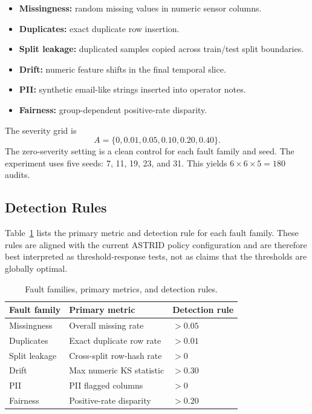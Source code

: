 \documentclass[runningheads]{llncs}
\begin{document}
\begin{itemize}
    \item \textbf{Missingness:} random missing values in numeric sensor columns.
    \item \textbf{Duplicates:} exact duplicate row insertion.
    \item \textbf{Split leakage:} duplicated samples copied across train/test
    split boundaries.
    \item \textbf{Drift:} numeric feature shifts in the final temporal slice.
    \item \textbf{PII:} synthetic email-like strings inserted into operator notes.
    \item \textbf{Fairness:} group-dependent positive-rate disparity.
\end{itemize}

The severity grid is
\[
A=\{0, 0.01, 0.05, 0.10, 0.20, 0.40\}.
\]
The zero-severity setting is a clean control for each fault family and seed. The
experiment uses five seeds: 7, 11, 19, 23, and 31. This yields
$6 \times 6 \times 5 = 180$ audits.

\subsection{Detection Rules}

Table~\ref{tab:detection-rules} lists the primary metric and detection rule for
each fault family. These rules are aligned with the current ASTRID policy
configuration and are therefore best interpreted as threshold-response tests, not
as claims that the thresholds are globally optimal.

\begin{table}
\centering
\caption{Fault families, primary metrics, and detection rules.}
\label{tab:detection-rules}
\begin{tabular}{lll}
\toprule
Fault family & Primary metric & Detection rule \\
\midrule
Missingness & Overall missing rate & $> 0.05$ \\
Duplicates & Exact duplicate row rate & $> 0.01$ \\
Split leakage & Cross-split row-hash rate & $> 0$ \\
Drift & Max numeric KS statistic & $> 0.30$ \\
PII & PII flagged columns & $> 0$ \\
Fairness & Positive-rate disparity & $> 0.20$ \\
\bottomrule
\end{tabular}
\end{table}
\end{document}
